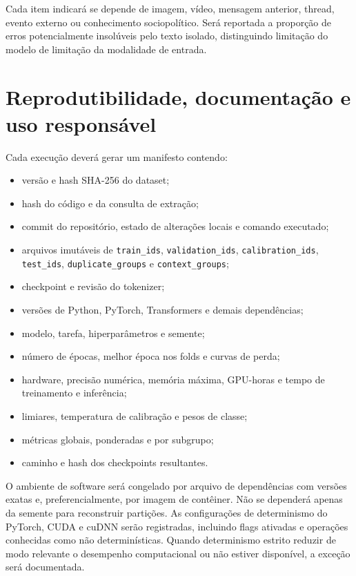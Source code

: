 Cada item indicará se depende de imagem, vídeo, mensagem anterior, thread,
evento externo ou conhecimento sociopolítico. Será reportada a proporção de
erros potencialmente insolúveis pelo texto isolado, distinguindo limitação do
modelo de limitação da modalidade de entrada.

\section{Reprodutibilidade, documentação e uso responsável}
\label{sec:reprodutibilidade}

Cada execução deverá gerar um manifesto contendo:

\begin{itemize}
    \item versão e hash SHA-256 do dataset;
    \item hash do código e da consulta de extração;
    \item commit do repositório, estado de alterações locais e comando executado;
    \item arquivos imutáveis de \texttt{train\_ids}, \texttt{validation\_ids},
    \texttt{calibration\_ids}, \texttt{test\_ids},
    \texttt{duplicate\_groups} e \texttt{context\_groups};
    \item checkpoint e revisão do tokenizer;
    \item versões de Python, PyTorch, Transformers e demais dependências;
    \item modelo, tarefa, hiperparâmetros e semente;
    \item número de épocas, melhor época nos folds e curvas de perda;
    \item hardware, precisão numérica, memória máxima, GPU-horas e tempo de
    treinamento e inferência;
    \item limiares, temperatura de calibração e pesos de classe;
    \item métricas globais, ponderadas e por subgrupo;
    \item caminho e hash dos checkpoints resultantes.
\end{itemize}

O ambiente de software será congelado por arquivo de dependências com versões
exatas e, preferencialmente, por imagem de contêiner. Não se dependerá apenas da
semente para reconstruir partições. As configurações de determinismo do PyTorch,
CUDA e cuDNN serão registradas, incluindo flags ativadas e operações conhecidas
como não determinísticas. Quando determinismo estrito reduzir de modo relevante
o desempenho computacional ou não estiver disponível, a exceção será documentada.

